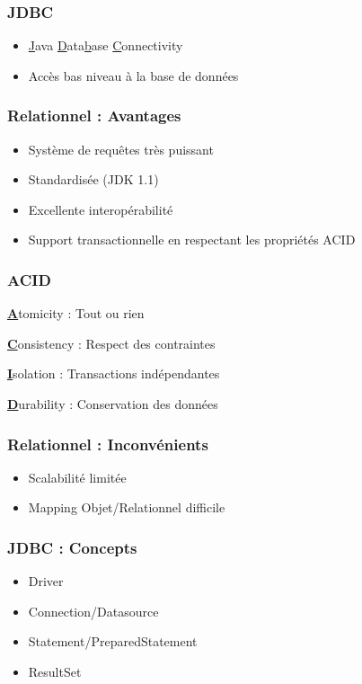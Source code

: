 \documentclass[t,12pt]{beamer}
\begin{document}
\begin{frame}
	\frametitle{JDBC}

	\begin{itemize}
		\item \underline{J}ava \underline{D}ata\underline{b}ase \underline{C}onnectivity
		\item Acc\`es bas niveau \`a la base de donn\'ees
	\end{itemize}
\end{frame}

\begin{frame}
	\frametitle{Relationnel : Avantages}

	\begin{itemize}
		\item Syst\`eme de requ\^etes tr\`es puissant
		\item Standardis\'ee (JDK 1.1)
		\item Excellente interop\'erabilit\'e
		\item Support transactionnelle en respectant les propri\'et\'es ACID
	\end{itemize}
\end{frame}

\begin{frame}
	\frametitle{ACID}

	\begin{description}
		\item \underline{\textbf{A}}tomicity : Tout ou rien
		\item \underline{\textbf{C}}onsistency : Respect des contraintes
		\item \underline{\textbf{I}}solation : Transactions ind\'ependantes
		\item \underline{\textbf{D}}urability : Conservation des donn\'ees
	\end{description}
\end{frame}

\begin{frame}
	\frametitle{Relationnel : Inconv\'enients}

	\begin{itemize}
		\item Scalabilit\'e limit\'ee
		\item Mapping Objet/Relationnel difficile
	\end{itemize}
\end{frame}

\begin{frame}
	\frametitle{JDBC : Concepts}

	\begin{itemize}
		\item Driver
		\item Connection/Datasource
		\item Statement/PreparedStatement
		\item ResultSet
	\end{itemize}
\end{frame}
\end{document}
